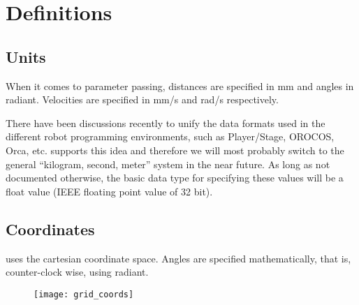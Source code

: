 \chapter{Definitions}


\section{Units}

When it comes to parameter passing, distances are specified in mm and
angles in radiant. Velocities are specified in mm/s and rad/s
respectively. 

There have been discussions recently to unify the data formats used in
the different robot programming environments, such as Player/Stage,
OROCOS, Orca, etc. \miro supports this idea and therefore we will most
probably switch to the general ``kilogram, second, meter'' system in
the near future. As long as not documented otherwise, the basic data
type for specifying these values will be a float value (IEEE floating
point value of 32 bit).

\section{Coordinates}

\miro uses the cartesian coordinate space. Angles are specified
mathematically, that is, counter-clock wise, using radiant.



\begin{figure}[!ht]
  \begin{center}
    \texttt{[image: grid\_coords]}
  \end{center}
\end{figure}


